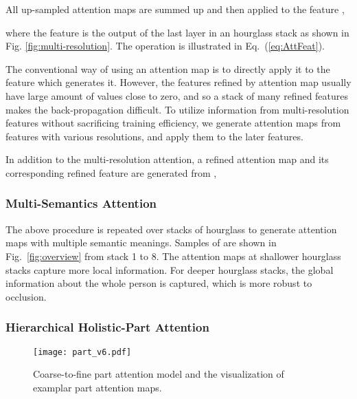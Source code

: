 \documentclass[10pt,twocolumn,letterpaper]{article}
\begin{document}
All up-sampled attention maps are summed up and then applied to the feature , 

where the feature  is the output of the last layer in an hourglass stack as shown in Fig. \ref{fig:multi-resolution}. The operation  is illustrated in Eq.~(\ref{eq:AttFeat}).

The conventional way of using an attention map is to directly apply it to the feature which generates it. 
However, the features refined by attention map usually have large amount of values close to zero, and so a stack of many refined features makes the back-propagation difficult. 
To utilize information from multi-resolution features without sacrificing training efficiency, we generate attention maps from features with various resolutions, and apply them to the later features.


In addition to the multi-resolution attention, a refined attention map  and its corresponding refined feature  are generated from , 


\vspace{-1em}
\subsubsection{Multi-Semantics Attention} 
\label{Sec:multi-semantics}
The above procedure is repeated over stacks of hourglass to generate attention maps with multiple semantic meanings. 
Samples of  are shown in Fig.~\ref{fig:overview} from stack 1 to 8. 
The attention maps at shallower hourglass stacks capture more local information.
For deeper hourglass stacks, the global information about the whole person is captured, which is more robust to occlusion. \






\subsubsection{Hierarchical Holistic-Part Attention}
\label{Sec:partAtt}

\begin{figure}[t]
\begin{center}
\texttt{[image: part\_v6.pdf]}
\end{center}
	\vspace{-1.5em}
   \caption{\small Coarse-to-fine part attention model and the visualization of examplar part attention maps.}
   	\vspace{-1.5em}
\label{fig:part}
\end{figure}
 
\end{document}
